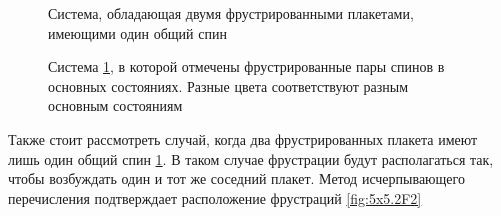 \documentclass[utf8, babel, sor, jor, amsmath, amssymb, reprint]{elsarticle} %
\begin{document}
\begin{figure}[H]
	\centering
	\caption{Система, обладающая двумя фрустрированными плакетами, имеющими один общий спин}
	\label{fig:5x5.2F}
\end{figure}
\begin{figure}[H]
	\centering
	\caption{Система \ref{fig:5x5.2F}, в которой отмечены фрустрированные пары спинов в основных состояниях. Разные цвета соответствуют разным основным состояниям}
	\label{fig:5x5.22F}
\end{figure}
Также стоит рассмотреть случай, когда два фрустрированных плакета имеют лишь один общий спин \ref{fig:5x5.2F}.
В таком случае фрустрации будут располагаться так, чтобы возбуждать один и тот же соседний плакет.
Метод исчерпывающего перечисления подтверждает расположение фрустраций \ref{fig:5x5.2F2}
\end{document}
